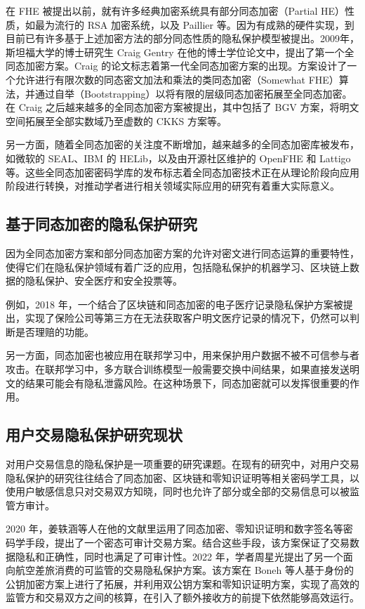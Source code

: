在 FHE 被提出以前，就有许多经典加密系统具有部分同态加密（Partial HE）性质，如最为流行的 RSA 加密系统，以及 Paillier 等。因为有成熟的硬件实现，到目前已有许多基于上述加密方法的部分同态性质的隐私保护模型被提出。2009年，斯坦福大学的博士研究生 Craig Gentry 在他的博士学位论文中，提出了第一个全同态加密方案\cite{homenc}。Craig 的论文标志着第一代全同态加密方案的出现。方案设计了一个允许进行有限次数的同态密文加法和乘法的类同态加密（Somewhat FHE）算法，并通过自举（Bootstrapping）以将有限的层级同态加密拓展至全同态加密。在 Craig 之后越来越多的全同态加密方案被提出，其中包括了 BGV 方案，将明文空间拓展至全部实数域乃至虚数的 CKKS\cite{cryptoeprint:2016/421} 方案等。

另一方面，随着全同态加密的关注度不断增加，越来越多的全同态加密库被发布，如微软的 SEAL\cite{sealcrypto}、IBM 的 HELib，以及由开源社区维护的 OpenFHE\cite{OpenFHE} 和 Lattigo\cite{Mouchet2020LattigoAM} 等。这些全同态加密密码学库的发布标志着全同态加密技术正在从理论阶段向应用阶段进行转换\cite{ZQL-SEAL}，对推动学者进行相关领域实际应用的研究有着重大实际意义。

\subsection{基于同态加密的隐私保护研究}

因为全同态加密方案和部分同态加密方案的允许对密文进行同态运算的重要特性，使得它们在隐私保护领域有着广泛的应用，包括隐私保护的机器学习、区块链上数据的隐私保护、安全医疗和安全投票等。

例如，2018 年，一个结合了区块链和同态加密的电子医疗记录隐私保护方案被提出\cite{Homo_Medi}，实现了保险公司等第三方在无法获取客户明文医疗记录的情况下，仍然可以判断是否理赔的功能。

另一方面，同态加密也被应用在联邦学习中，用来保护用户数据不被不可信参与者攻击。\cite{FL_HE}在联邦学习中，多方联合训练模型一般需要交换中间结果，如果直接发送明文的结果可能会有隐私泄露风险。在这种场景下，同态加密就可以发挥很重要的作用。

\subsection{用户交易隐私保护研究现状}

对用户交易信息的隐私保护是一项重要的研究课题。在现有的研究中，对用户交易隐私保护的研究往往结合了同态加密、区块链和零知识证明等相关密码学工具，以使用户敏感信息只对交易双方知晓，同时也允许了部分或全部的交易信息可以被监管方审计。

2020 年，姜轶涵等人在他的文献里\cite{ACT}运用了同态加密、零知识证明和数字签名等密码学手段，提出了一个密态可审计交易方案。结合这些手段，该方案保证了交易数据隐私和正确性，同时也满足了可审计性。2022 年，学者周星光提出了另一个面向航空差旅消费的可监管的交易隐私保护方案。\cite{ZXG_Air_privacy}该方案在 Boneh 等人基于身份的公钥加密方案上进行了拓展，并利用双公钥方案和零知识证明方案，实现了高效的监管方和交易双方之间的核算，在引入了额外接收方的前提下依然能够高效运行。

